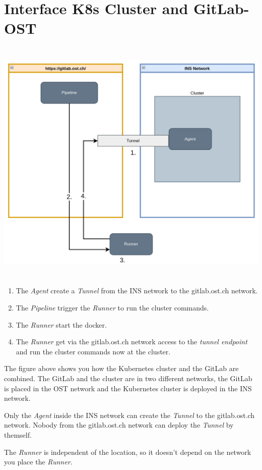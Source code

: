 \chapter{Interface K8s Cluster and GitLab-OST}

\includegraphics[height=12cm]{resources/k8s_including_in_gitlab-ost.png}
\begin{enumerate}
    \item The \textit{Agent} create a \textit{Tunnel} from the INS network to the gitlab.ost.ch network.
    \item The \textit{Pipeline} trigger the \textit{Runner} to run the cluster commands.
    \item The \textit{Runner} start the docker.
    \item The \textit{Runner} get via the gitlab.ost.ch network access to the \textit{tunnel endpoint} and run the cluster commands now at the cluster.
\end{enumerate}

The figure above shows you how the Kubernetes cluster and the GitLab are combined. The GitLab and the cluster are in two different networks, the GitLab is placed in the OST network and the Kubernetes cluster is deployed in the INS network.

Only the \textit{Agent} inside the INS network can create the \textit{Tunnel} to the gitlab.ost.ch network. Nobody from the gitlab.ost.ch network can deploy the \textit{Tunnel} by themself.

The \textit{Runner} is independent of the location, so it doesn't depend on the network you place the \textit{Runner}.